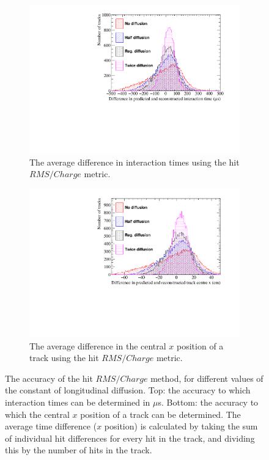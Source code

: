 \begin{figure}
  \centering
  \begin{subfigure}{0.6\textwidth}
    \centering
    \includegraphics[width=\textwidth]{Canvas_AvDiff_T_RMS_Q_Diffusion}
    \caption{The average difference in interaction times using the hit $RMS/Charge$ metric.}
    \label{fig:DiffLDiff_AvDiff_RMS_Int_T}
  \end{subfigure}
  \begin{subfigure}{0.6\textwidth}
    \centering
    \includegraphics[width=\textwidth]{Canvas_AvDiff_X_RMS_Q_Diffusion}
    \caption{The average difference in the central $x$ position of a track using the hit $RMS/Charge$ metric.}
    \label{fig:DiffLDiff_AvDiff_RMS_Int_X}
  \end{subfigure}
  \caption[Comparing the accuracy of the hit $RMS$ method, as the constant of longitudinal diffusion changes]
          {The accuracy of the hit $RMS/Charge$ method, for different values of the constant of longitudinal diffusion. Top: the accuracy to which interaction times can be determined in $\mu$s. Bottom: the accuracy to which the central $x$ position of a track can be determined. The average time difference ($x$ position) is calculated by taking the sum of individual hit differences for every hit in the track, and dividing this by the number of hits in the track.}
  \label{fig:DiffLDiff_AvDiff_RMS_Int}
\end{figure}

